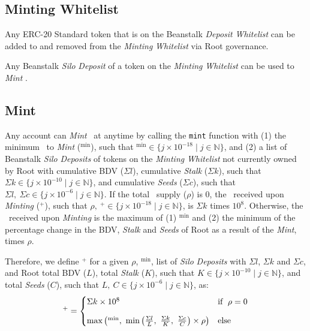 \documentclass[tikz]{article}
\newcommand{\code}[1]{\texttt{#1}}
\newcommand{\term}[1]{\textsl{#1}}
\newcommand{\Root}{} %
\begin{document}
\subsection{Minting Whitelist}
Any ERC-20 Standard token that is on the Beanstalk \term{Deposit} \term{Whitelist} can be added to and removed from the \term{Minting} \term{Whitelist} via Root governance. 

Any Beanstalk \term{Silo} \term{Deposit} of a token on the \term{Minting} \term{Whitelist} can be used to \term{Mint} \Root.

\subsection{Mint}
Any account can \term{Mint} \Root\ at anytime by calling the \code{mint} function with (1) the minimum \Root\ to \term{Mint} ($\Root^{\text{min}}$), such that $\Root^{\text{min}} \in \{j \times 10^{-18} \mid j \in \mathbb{N}\}$, and (2) a list of Beanstalk \term{Silo} \term{Deposits} of tokens on the \term{Minting} \term{Whitelist} not currently owned by Root with cumulative BDV ($\Sigma l$), cumulative \term{Stalk} ($\Sigma k$), such that $\Sigma k \in \{j \times 10^{-10} \mid j \in \mathbb{N}\}$,  and cumulative \term{Seeds} ($\Sigma c$), such that $\Sigma l,\ \Sigma c \in \{j \times 10^{-6} \mid j \in \mathbb{N}\}$. If the total \Root\ supply ($\rho$) is 0, the \Root\ received upon \term{Minting} ($\Root^{+}$), such that $\rho ,\ \Root^{+} \in \{j \times 10^{-18} \mid j \in \mathbb{N}\}$, is $\Sigma k$ times $10^{8}$. Otherwise, the \Root\ received upon \term{Minting} is the maximum of (1) $\Root^{\text{min}}$ and (2) the minimum of the percentage change in the BDV, \term{Stalk} and \term{Seeds} of Root as a result of the \term{Mint}, times $\rho$. 

Therefore, we define $\Root^{+}$ for a given $\rho$, $\Root^{\text{min}}$, list of \term{Silo} \term{Deposits} with $\Sigma l$, $\Sigma k$ and $\Sigma c$, and Root total BDV ($L$), total \term{Stalk} ($K$), such that $K \in \{j \times 10^{-10} \mid j \in \mathbb{N}\}$, and total \term{Seeds} ($C$), such that $L,\ C \in \{j \times 10^{-6} \mid j \in \mathbb{N}\}$, as:
$$\Root^{+} = \begin{cases} \Sigma k \times 10^{8} & \text{if}\ \; \rho = 0 \vspace{.3cm} \\ 
\text{max}\left(\Root^{\text{min}},\ \text{min}\left(\frac{\Sigma l}{L},\ \frac{\Sigma k}{K},\ \frac{\Sigma c}{C}\right) \times \rho \right) & \text{else}\end{cases}$$
\end{document}
